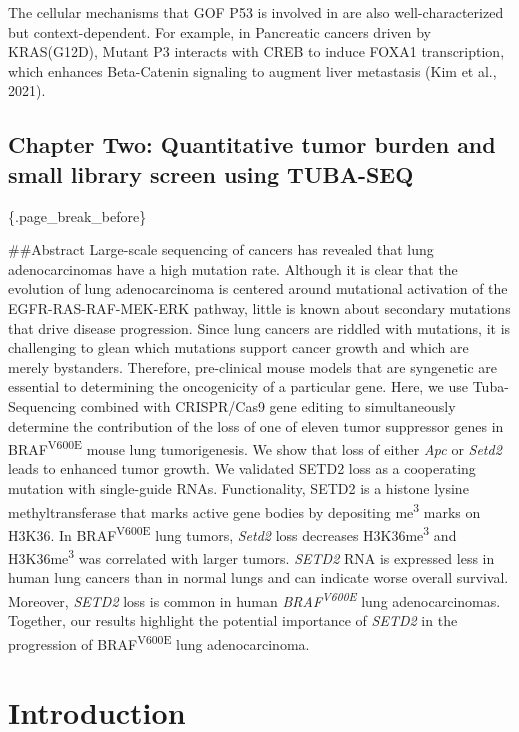 The cellular mechanisms that GOF P53 is involved in are also well-characterized but context-dependent. For example, in Pancreatic cancers driven by KRAS(G12D), Mutant P3 interacts with CREB to induce FOXA1 transcription, which enhances Beta-Catenin signaling to augment liver metastasis (Kim et al., 2021).

\hypertarget{chapter-two-quantitative-tumor-burden-and-small-library-screen-using-tuba-seq}{%
\subsection{Chapter Two: Quantitative tumor burden and small library screen using TUBA-SEQ}\label{chapter-two-quantitative-tumor-burden-and-small-library-screen-using-tuba-seq}}

\{.page\_break\_before\}

\#\#Abstract
Large-scale sequencing of cancers has revealed that lung adenocarcinomas have a high mutation rate. Although it is clear that the evolution of lung adenocarcinoma is centered around mutational activation of the EGFR-RAS-RAF-MEK-ERK pathway, little is known about secondary mutations that drive disease progression. Since lung cancers are riddled with mutations, it is challenging to glean which mutations support cancer growth and which are merely bystanders. Therefore, pre-clinical mouse models that are syngenetic are essential to determining the oncogenicity of a particular gene. Here, we use Tuba-Sequencing combined with CRISPR/Cas9 gene editing to simultaneously determine the contribution of the loss of one of eleven tumor suppressor genes in BRAF\textsuperscript{V600E} mouse lung tumorigenesis. We show that loss of either \emph{Apc} or \emph{Setd2} leads to enhanced tumor growth. We validated SETD2 loss as a cooperating mutation with single-guide RNAs. Functionality, SETD2 is a histone lysine methyltransferase that marks active gene bodies by depositing me\textsuperscript{3} marks on H3K36. In BRAF\textsuperscript{V600E} lung tumors, \emph{Setd2} loss decreases H3K36me\textsuperscript{3} and H3K36me\textsuperscript{3} was correlated with larger tumors. \emph{SETD2} RNA is expressed less in human lung cancers than in normal lungs and can indicate worse overall survival. Moreover, \emph{SETD2} loss is common in human \emph{BRAF\textsuperscript{V600E}} lung adenocarcinomas. Together, our results highlight the potential importance of \emph{SETD2} in the progression of BRAF\textsuperscript{V600E} lung adenocarcinoma.

\hypertarget{introduction}{%
\section{Introduction}\label{introduction}}

